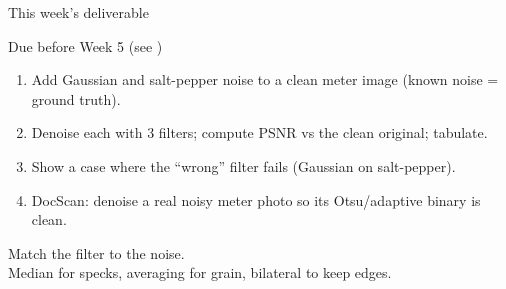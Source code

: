\documentclass[10pt,aspectratio=169]{beamer}
\begin{document}
\begin{frame}{This week's deliverable}
  \begin{alertblock}{Due before Week 5 (see )}
    \begin{enumerate}
      \item Add Gaussian and salt-pepper noise to a clean meter image (known noise = ground truth).
      \item Denoise each with 3 filters; compute PSNR vs the clean original; tabulate.
      \item Show a case where the ``wrong'' filter fails (Gaussian on salt-pepper).
      \item DocScan: denoise a real noisy meter photo so its Otsu/adaptive binary is clean.
    \end{enumerate}
  \end{alertblock}
\end{frame}

\begin{frame}[standout]
  Match the filter to the noise.\\[4pt]
  \normalsize Median for specks, averaging for grain, bilateral to keep edges.
\end{frame}
\end{document}
